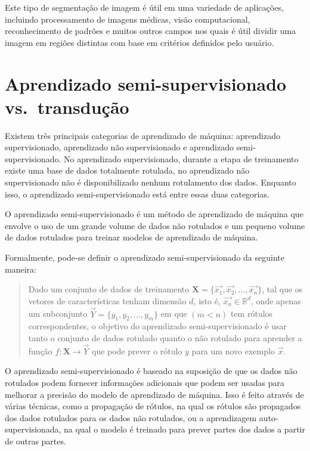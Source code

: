 Este tipo de segmentação de imagem é útil em uma variedade de
aplicações, incluindo processamento de imagens médicas, visão
computacional, reconhecimento de padrões e muitos outros campos nos quais é
útil dividir uma imagem em regiões distintas com base em
critérios definidos pelo usuário.

\section{Aprendizado semi-supervisionado vs.\ transdução}\label{sec:teorica-aprendizado-semi-supervisionado}

Existem três principais categorias de aprendizado de máquina:
aprendizado supervisionado, aprendizado não supervisionado e
aprendizado semi-supervisionado. No aprendizado supervisionado, durante
a etapa de treinamento existe uma base de dados totalmente rotulada,
no aprendizado não supervisionado não é disponibilizado nenhum
rotulamento dos dados. Enquanto isso, o aprendizado
semi-supervisionado está entre essas duas categorias.

O aprendizado semi-supervisionado é um método de aprendizado de máquina
que envolve o uso de um grande volume de dados não rotulados e um
pequeno volume de dados rotulados para treinar modelos de aprendizado
de máquina.

Formalmente, pode-se definir o aprendizado semi-supervisionado da seguinte maneira:

\begin{quote}
  Dado um conjunto de dados de treinamento
  $ \mathbf{X} = \{\vec{x_1}, \vec{x_2}, \ldots, \vec{x_n}\} $, tal que os
  vetores de características tenham dimensão $d$, isto é, $ \vec{x_n} \in \mathbb{R}^d $,
  onde apenas um subconjunto  $ \vec{Y} = \{y_1, y_2, \ldots , y_m\} $ em que $ (m < n) $ tem rótulos
  correspondentes, o objetivo do aprendizado semi-supervisionado é usar
  tanto o conjunto de dados rotulado quanto o não rotulado para aprender
  a função $ f: \mathbf{X} \rightarrow \vec{Y} $ que pode prever o rótulo $ y $ para um novo
  exemplo $ \vec{x} $.
\end{quote}

O aprendizado semi-supervisionado é baseado na suposição de que os
dados não rotulados podem fornecer informações adicionais que podem
ser usadas para melhorar a precisão do modelo de aprendizado de
máquina. Isso é feito através de várias técnicas, como a propagação de
rótulos, na qual os rótulos são propagados dos dados rotulados para os
dados não rotulados, ou a aprendizagem auto-supervisionada, na qual o
modelo é treinado para prever partes dos dados a partir de outras
partes.

